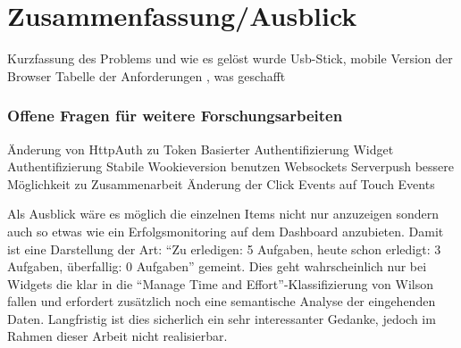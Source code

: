 \chapter{Zusammenfassung/Ausblick} 
\label{Kapitel 7}
Kurzfassung des Problems und wie es gelöst wurde
Usb-Stick, mobile Version der Browser
Tabelle der Anforderungen , was geschafft


\subsection{Offene Fragen für weitere Forschungsarbeiten}
Änderung von HttpAuth zu Token Basierter Authentifizierung
Widget Authentifizierung
Stabile Wookieversion benutzen
Websockets
Serverpush
bessere Möglichkeit zu Zusammenarbeit
Änderung der Click Events auf Touch Events

Als Ausblick wäre es möglich die einzelnen Items nicht nur anzuzeigen sondern auch so etwas wie ein Erfolgsmonitoring auf dem Dashboard anzubieten. Damit ist eine Darstellung der Art: “Zu erledigen: 5 Aufgaben, heute schon erledigt: 3 Aufgaben, überfallig: 0 Aufgaben” gemeint. Dies geht wahrscheinlich nur bei Widgets die klar in die “Manage Time and Effort”-Klassifizierung von Wilson fallen und erfordert zusätzlich noch eine semantische Analyse der eingehenden Daten. Langfristig ist dies sicherlich ein sehr interessanter Gedanke, jedoch im Rahmen dieser Arbeit nicht realisierbar.



